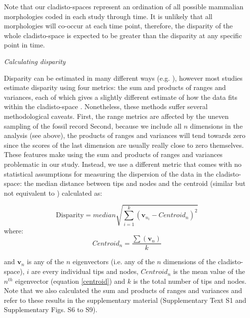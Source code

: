 \documentclass[12pt,letterpaper]{article}
\renewcommand{\subsection}[1]{%
\bigskip
\begin{center}
\begin{large}
\normalfont\itshape #1
\end{large}
\end{center}}
\begin{document}
Note that our cladisto-spaces represent an ordination of all possible mammalian morphologies coded in each study through time.
It is unlikely that all morphologies will co-occur at each time point, therefore, the disparity of the whole cladisto-space is expected to be greater than the disparity at any specific point in time.

\subsection{Calculating disparity}
Disparity can be estimated in many different ways (e.g. \cite{Wills1994,Ciampaglio2001}), however most studies estimate disparity using four metrics: the sum and products of ranges and variances, each of which gives a slightly different estimate of how the data fits within the cladisto-space \cite{Wills1994,brusatte50,Brusatte12092008,toljagictriassic-jurassic2013,ruta2013,bensonfaunal2014}.
Nonetheless, these methods suffer several methodological caveats.
First, the range metrics are affected by the uneven sampling of the fossil record \cite{Butler2012}
Second, because we include all $n$ dimensions in the analysis (see above), the products of ranges and variances will tend towards zero since the scores of the last dimension are usually really close to zero themselves. 
These features make using the sum and products of ranges and variances problematic in our study.
Instead, we use a different metric that comes with no statistical assumptions for measuring the dispersion of the data in the cladisto-space: the median distance between tips and nodes and the centroid (similar but not equivalent to \cite{Wills1994,kornextinction2013}) calculated as:

\begin{equation}
   \text{Disparity}=median{\displaystyle\sqrt{\sum_{i=1}^{k}{(\mathbf{v}_{n_{i}}-Centroid_{n})^2}}}
    \label{disparity}
\end{equation}
where:
\begin{equation}
    Centroid_{n}=\frac{\displaystyle\sum(\mathbf{v}_{n})}{k} 
    \label{centroid}
\end{equation}

\noindent
and $\mathbf{v}_{n}$ is any of the $n$ eigenvectors (i.e. any of the $n$ dimensions of the cladisto-space), $i$ are every individual tips and nodes, $Centroid_{n}$ is the mean value of the $n^{th}$ eigenvector (equation \ref{centroid}) and $k$ is the total number of tips and nodes.
Note that we also calculated the sum and products of ranges and variances and refer to these results in the supplementary material (Supplementary Text S1 and Supplementary Figs. S6 to S9).
\end{document}

